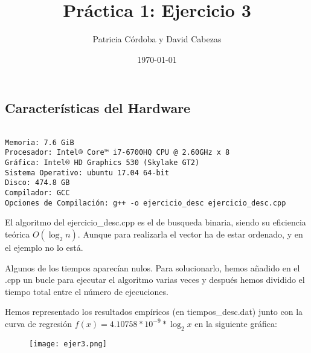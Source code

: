 \documentclass{article}
\begin{document}
\title{Práctica 1: Ejercicio 3}
\author{Patricia Córdoba y David Cabezas}
\date{\today}
\maketitle

\subsection*{Características del Hardware}
\begin{verbatim}

Memoria: 7.6 GiB
Procesador: Intel® Core™ i7-6700HQ CPU @ 2.60GHz x 8
Gráfica: Intel® HD Graphics 530 (Skylake GT2)
Sistema Operativo: ubuntu 17.04 64-bit
Disco: 474.8 GB
Compilador: GCC
Opciones de Compilación: g++ -o ejercicio_desc ejercicio_desc.cpp

\end{verbatim}

\begin{justify}
  El algoritmo del ejercicio\_desc.cpp es el de busqueda binaria,
  siendo su eficiencia teórica $O(\log_{2}n)$. Aunque para realizarla el
  vector ha de estar ordenado, y en el ejemplo no lo está.
\end{justify}

\begin{justify}

  Algunos de los tiempos aparecían nulos. Para solucionarlo, hemos
  añadido en el .cpp un bucle para ejecutar el algoritmo varias veces
  y después hemos dividido el tiempo total entre el número de
  ejecuciones.
  
\end{justify}

\begin{justify}
  Hemos representado los resultados empíricos (en
  tiempos\_desc.dat) junto con la curva de regresión
  $f(x)=4.10758*10^{-9}*\log_{2}x$ en la siguiente gráfica:
\end{justify}

\begin{figure}[H]
  \centering
  \texttt{[image: ejer3.png]}
\end{figure}
\end{document}
